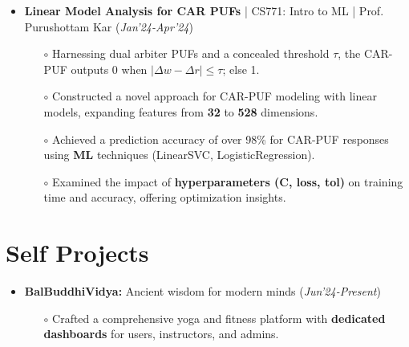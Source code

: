 \documentclass[10.8pt, a4paper]{extarticle}
\newcommand{\shorterSection}[1]{\vspace{-10pt}\section{#1}}
\begin{document}
{\begin{itemize}
   \item \textbf{Linear Model Analysis for CAR PUFs} | CS771: Intro to ML | Prof.  Purushottam Kar \href{https://github.com/vishalsavarna/Linear_Model_Analysis_for_CAR_PUF-CS771}{\faGithub{}}  \hfill(\textit{Jan'24-Apr'24})
	\\[-0.6cm]
	\begin{itemize}
 \item[$\circ$] Harnessing dual arbiter PUFs and a concealed threshold $\tau$, the CAR-PUF outputs 0 when $|\Delta w - \Delta r| \leq \tau$; else 1.\\[-0.6cm]
 
\item[$\circ$] Constructed a novel approach for CAR-PUF modeling with linear models, expanding features from \textbf{32} to \textbf{528} dimensions.\\[-0.6cm]
 
\item[$\circ$]  Achieved a prediction accuracy of over 98\% for CAR-PUF responses using \textbf{ML} techniques (LinearSVC, LogisticRegression).\\[-0.6cm]
 
\item[$\circ$] Examined the impact of \textbf{hyperparameters (C, loss, tol)} on training time and accuracy, offering optimization insights.\\[-0.6cm]



	\end{itemize}

 

 \medskip

\end{itemize}
\vspace{-1mm}


\shorterSection{Self Projects}
\vspace{-2pt}
\begin{itemize}

 \item \textbf{BalBuddhiVidya:}  Ancient wisdom for modern minds
\href{https://github.com/vishalsavarna/BalBuddhiVidya}{\faGithub{}} \hfill(\textit{Jun'24-Present})
	\\[-0.6cm]
	\begin{itemize}
	    \item[$\circ$] Crafted a comprehensive yoga and fitness platform with \textbf{dedicated dashboards} for users, instructors, and admins.\\[-0.6cm]



\end{itemize}
\end{itemize}}
\end{document}
